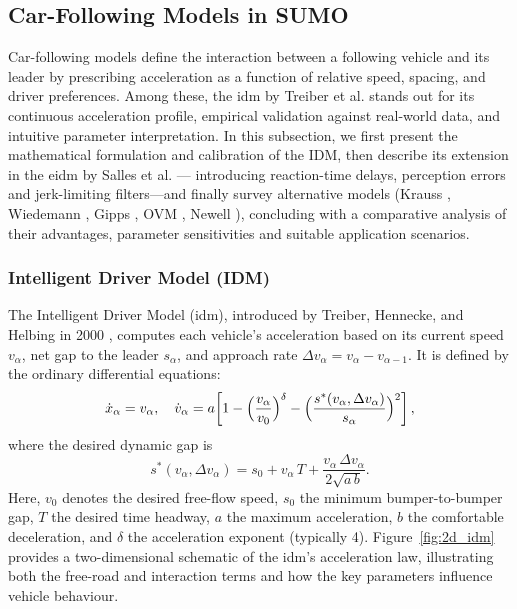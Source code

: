 
\subsection{Car-Following Models in SUMO}
\label{subsec:car_following_models}

Car-following models define the interaction between a following vehicle and its leader by prescribing acceleration as a function of relative speed, spacing, and driver preferences. Among these, the \ac{idm} by Treiber et al. \cite{Treiber_2000} stands out for its continuous acceleration profile, empirical validation against real-world data, and intuitive parameter interpretation. In this subsection, we first present the mathematical formulation and calibration of the IDM, then describe its extension in the \ac{eidm} by Salles et al. \cite{Salles2022} --- introducing reaction-time delays, perception errors and jerk-limiting filters—and finally survey alternative models (Krauss \cite{Krauss1997}, Wiedemann \cite{Wiedemann1974}, Gipps \cite{Gipps1981}, OVM \cite{Bando1995}, Newell \cite{Newell1961}), concluding with a comparative analysis of their advantages, parameter sensitivities and suitable application scenarios.

\subsubsection{Intelligent Driver Model (IDM)}
\label{subsubsec:idm}
The Intelligent Driver Model (\ac{idm}), introduced by Treiber, Hennecke, and Helbing in 2000 \cite{Treiber_2000}, computes each vehicle’s acceleration based on its current speed $v_\alpha$, net gap to the leader $s_\alpha$, and approach rate $\Delta v_\alpha = v_\alpha - v_{\alpha-1}$. It is defined by the ordinary differential equations:
\[
\dot{x}_\alpha = v_\alpha,
\quad
\dot{v}_\alpha = a\!\left[1 - \Bigl(\frac{v_\alpha}{v_0}\Bigr)^\delta - \Bigl(\frac{s^*(v_\alpha,\Delta v_\alpha)}{s_\alpha}\Bigr)^2\right],
\]
where the desired dynamic gap is
\[
s^*(v_\alpha,\Delta v_\alpha) = s_0 + v_\alpha\,T + \frac{v_\alpha\,\Delta v_\alpha}{2\sqrt{a\,b}}.
\]
Here, \(v_0\) denotes the desired free-flow speed, \(s_0\) the minimum bumper-to-bumper gap, \(T\) the desired time headway, \(a\) the maximum acceleration, \(b\) the comfortable deceleration, and \(\delta\) the acceleration exponent (typically 4). Figure~\ref{fig:2d_idm} provides a two-dimensional schematic of the \ac{idm}’s acceleration law, illustrating both the free-road and interaction terms and how the key parameters influence vehicle behaviour.


